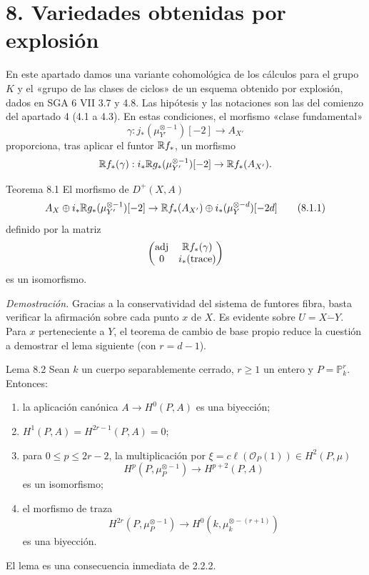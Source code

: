 \section*{8. Variedades obtenidas por explosión}

En este apartado damos una variante cohomológica de los cálculos para el grupo $K$ y el «grupo de las clases de ciclos» de un esquema obtenido por explosión, dados en SGA 6 VII 3.7 y 4.8. Las hipótesis y las notaciones son las del comienzo del apartado 4 (4.1 a 4.3). En estas condiciones, el morfismo «clase fundamental»
\[
\gamma:j_*(\mu_{Y'}^{\otimes -1})[-2]\to A_{X'}
\]
proporciona, tras aplicar el funtor $\mathbb{R} f_*$, un morfismo
\[
\mathbb{R} f_*(\gamma):i_*\mathbb{R} g_*(\mu_{Y'}^{\otimes -1})[-2]\to \mathbb{R} f_*(A_{X'}).
\]

\begin{statement}{Teorema 8.1}
El morfismo de $D^+(X,A)$
\[
A_X\oplus i_*\mathbb{R} g_*(\mu_{Y'}^{\otimes -1})[-2]\to
\mathbb{R} f_*(A_{X'})\oplus i_*(\mu_Y^{\otimes -d})[-2d]
\tag{8.1.1}
\]
definido por la matriz
\[
\begin{pmatrix}
\operatorname{adj}&\mathbb{R} f_*(\gamma)\\
0&i_*(\operatorname{trace})
\end{pmatrix}
\]
es un isomorfismo.
\end{statement}

\emph{Demostración.} Gracias a la conservatividad del sistema de funtores fibra, basta verificar la afirmación sobre cada punto $x$ de $X$. Es evidente sobre $U=X\mathbin{\dot{-}}Y$. Para $x$ perteneciente a $Y$, el teorema de cambio de base propio reduce la cuestión a demostrar el lema siguiente (con $r=d-1$).

\begin{statement}{Lema 8.2}
Sean $k$ un cuerpo separablemente cerrado, $r\ge1$ un entero y $P=\mathbb P_k^r$. Entonces:
\begin{enumerate}[label=\alph*)]
\item la aplicación canónica $A\to H^0(P,A)$ es una biyección;
\item $H^1(P,A)=H^{2r-1}(P,A)=0$;
\item para $0\le p\le2r-2$, la multiplicación por $\xi=c\ell(\mathcal O_P(1))\in H^2(P,\mu)$
\[
H^p(P,\mu_P^{\otimes -1})\to H^{p+2}(P,A)
\]
es un isomorfismo;
\item el morfismo de traza
\[
H^{2r}(P,\mu_P^{\otimes -1})\to H^0(k,\mu_k^{\otimes -(r+1)})
\]
es una biyección.
\end{enumerate}
\end{statement}

El lema es una consecuencia inmediata de 2.2.2.
